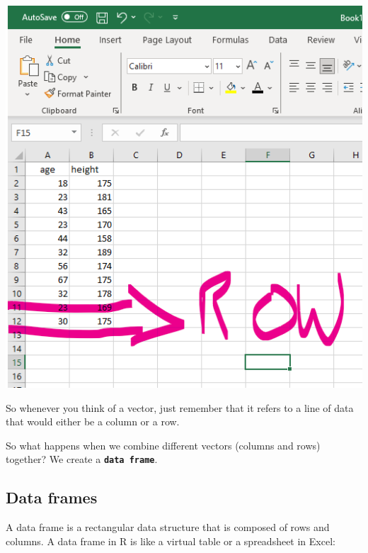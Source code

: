 \documentclass[
]{book}
\begin{document}
\includegraphics{img/03-row-vector.png}

So whenever you think of a vector, just remember that it refers to a line of data that would either be a column or a row.

So what happens when we combine different vectors (columns and rows) together? We create a \textbf{\texttt{data\ frame}}.

\hypertarget{data-frames}{%
\subsection{Data frames}\label{data-frames}}

A data frame is a rectangular data structure that is composed of rows and columns. A data frame in R is like a virtual table or a spreadsheet in Excel:
\end{document}
